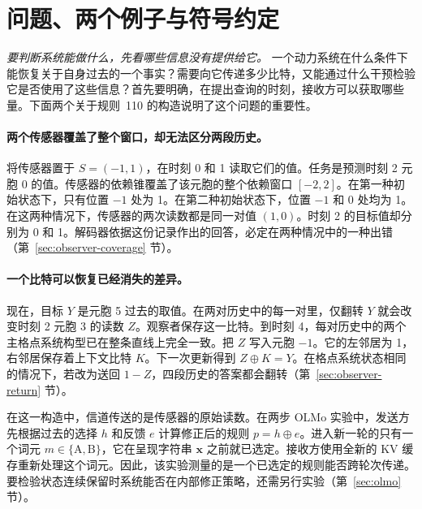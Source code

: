 \section{问题、两个例子与符号约定}
\emph{要判断系统能做什么，先看哪些信息没有提供给它。}
一个动力系统在什么条件下能恢复关于自身过去的一个事实？需要向它传递多少比特，又能通过什么干预检验它是否使用了这些信息？首先要明确，在提出查询的时刻，接收方可以获取哪些量。下面两个关于规则~110 的构造说明了这个问题的重要性。

\paragraph{两个传感器覆盖了整个窗口，却无法区分两段历史。}
将传感器置于 $S=(-1,1)$，在时刻 0 和 1 读取它们的值。任务是预测时刻 2 元胞 0 的值。传感器的依赖锥覆盖了该元胞的整个依赖窗口 $[-2,2]$。在第一种初始状态下，只有位置 $-1$ 处为 1。在第二种初始状态下，位置 $-1$ 和 $0$ 处均为 1。在这两种情况下，传感器的两次读数都是同一对值 $(1,0)$。时刻 2 的目标值却分别为 0 和 1。解码器依据这份记录作出的回答，必定在两种情况中的一种出错（第~\ref{sec:observer-coverage} 节）。

\paragraph{一个比特可以恢复已经消失的差异。}
现在，目标 $Y$ 是元胞 5 过去的取值。在两对历史中的每一对里，仅翻转 $Y$ 就会改变时刻 2 元胞 3 的读数 $Z$。观察者保存这一比特。到时刻 4，每对历史中的两个主格点系统构型已在整条直线上完全一致。把 $Z$ 写入元胞 $-1$。它的左邻居为 1，右邻居保存着上下文比特 $K$。下一次更新得到 $Z\oplus K=Y$。在格点系统状态相同的情况下，若改为送回 $1-Z$，四段历史的答案都会翻转（第~\ref{sec:observer-return} 节）。

在这一构造中，信道传送的是传感器的原始读数。在两步 OLMo 实验中，发送方先根据过去的选择 $h$ 和反馈 $e$ 计算修正后的规则 $p=h\oplus e$。进入新一轮的只有一个词元 $m\in\{\mathrm{A},\mathrm{B}\}$，它在呈现字符串 $\mathbf{x}$ 之前就已选定。接收方使用全新的 KV 缓存重新处理这个词元。因此，该实验测量的是一个已选定的规则能否跨轮次传递。要检验状态连续保留时系统能否在内部修正策略，还需另行实验（第~\ref{sec:olmo} 节）。

